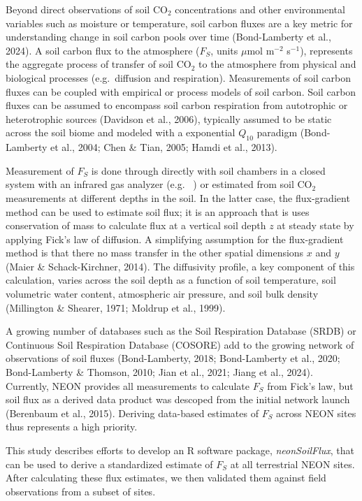 \documentclass[
  letterpaper,
  DIV=11,
  numbers=noendperiod]{scrartcl}
\begin{document}
Beyond direct observations of soil CO\(_{2}\) concentrations and other
environmental variables such as moisture or temperature, soil carbon
fluxes are a key metric for understanding change in soil carbon pools
over time (Bond-Lamberty et al., 2024). A soil carbon flux to the
atmosphere (\(F_{S}\), units \(\mu\)mol m\(^{-2}\) s\(^{-1}\)),
represents the aggregate process of transfer of soil CO\(_{2}\) to the
atmosphere from physical and biological processes (e.g.~diffusion and
respiration). Measurements of soil carbon fluxes can be coupled with
empirical or process models of soil carbon. Soil carbon fluxes can be
assumed to encompass soil carbon respiration from autotrophic or
heterotrophic sources (Davidson et al., 2006), typically assumed to be
static across the soil biome and modeled with a exponential \(Q_{10}\)
paradigm (Bond-Lamberty et al., 2004; Chen \& Tian, 2005; Hamdi et al.,
2013).

Measurement of \(F_{S}\) is done through directly with soil chambers in
a closed system with an infrared gas analyzer (e.g.~ ) or estimated from
soil CO\(_{2}\) measurements at different depths in the soil. In the
latter case, the flux-gradient method can be used to estimate soil flux;
it is an approach that is uses conservation of mass to calculate flux at
a vertical soil depth \(z\) at steady state by applying Fick's law of
diffusion. A simplifying assumption for the flux-gradient method is that
there no mass transfer in the other spatial dimensions \(x\) and \(y\)
(Maier \& Schack-Kirchner, 2014). The diffusivity profile, a key
component of this calculation, varies across the soil depth as a
function of soil temperature, soil volumetric water content, atmospheric
air pressure, and soil bulk density (Millington \& Shearer, 1971;
Moldrup et al., 1999).

A growing number of databases such as the Soil Respiration Database
(SRDB) or Continuous Soil Respiration Database (COSORE) add to the
growing network of observations of soil fluxes (Bond-Lamberty, 2018;
Bond-Lamberty et al., 2020; Bond-Lamberty \& Thomson, 2010; Jian et al.,
2021; Jiang et al., 2024). Currently, NEON provides all measurements to
calculate \(F_{S}\) from Fick's law, but soil flux as a derived data
product was descoped from the initial network launch (Berenbaum et al.,
2015). Deriving data-based estimates of \(F_{S}\) across NEON sites thus
represents a high priority.

This study describes efforts to develop an R software package,
\textit{neonSoilFlux}, that can be used to derive a standardized
estimate of \(F_{S}\) at all terrestrial NEON sites. After calculating
these flux estimates, we then validated them against field observations
from a subset of sites.
\end{document}

